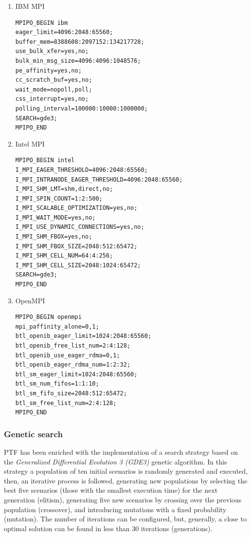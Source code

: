 \begin {enumerate}
\item IBM MPI

\begin{verbatim}
MPIPO_BEGIN ibm
eager_limit=4096:2048:65560;
buffer_mem=8388608:2097152:134217728;
use_bulk_xfer=yes,no;
bulk_min_msg_size=4096:4096:1048576;
pe_affinity=yes,no;
cc_scratch_buf=yes,no;
wait_mode=nopoll,poll;
css_interrupt=yes,no;
polling_interval=100000:10000:1000000;
SEARCH=gde3;
MPIPO_END
\end{verbatim}

\item Intel MPI

\begin{verbatim}
MPIPO_BEGIN intel
I_MPI_EAGER_THRESHOLD=4096:2048:65560;
I_MPI_INTRANODE_EAGER_THRESHOLD=4096:2048:65560;
I_MPI_SHM_LMT=shm,direct,no;
I_MPI_SPIN_COUNT=1:2:500;
I_MPI_SCALABLE_OPTIMIZATION=yes,no;
I_MPI_WAIT_MODE=yes,no;
I_MPI_USE_DYNAMIC_CONNECTIONS=yes,no;
I_MPI_SHM_FBOX=yes,no;
I_MPI_SHM_FBOX_SIZE=2048:512:65472;
I_MPI_SHM_CELL_NUM=64:4:256;
I_MPI_SHM_CELL_SIZE=2048:1024:65472;
SEARCH=gde3;
MPIPO_END
\end{verbatim}

\item OpenMPI

\begin{verbatim}
MPIPO_BEGIN openmpi
mpi_paffinity_alone=0,1;
btl_openib_eager_limit=1024:2048:65560;
btl_openib_free_list_num=2:4:128;
btl_openib_use_eager_rdma=0,1;
btl_openib_eager_rdma_num=1:2:32;
btl_sm_eager_limit=1024:2048:65560;
btl_sm_num_fifos=1:1:10;
btl_sm_fifo_size=2048:512:65472;
btl_sm_free_list_num=2:4:128;
MPIPO_END
\end{verbatim}
\end {enumerate}

\subsubsection{Genetic search}\label{para:MPI-gen}

PTF has been enriched with the implementation of a search strategy based on the \textit{Generalized Differential Evolution 3 (GDE3)} genetic algorithm. In this strategy a population of ten initial scenarios is randomly generated and executed, then, an iterative process is followed, generating new populations by selecting the best five scenarios (those with the smallest execution time) for the next generation (elitism), generating five new scenarios by crossing over the previous population (crossover), and introducing mutations with a fixed probability (mutation). The number of iterations can be configured, but, generally, a close to optimal solution can be found in less than 30 iterations (generations).

